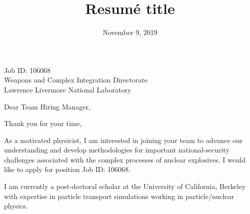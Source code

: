 \documentclass[11pt]{moderncv}        %
\title{Resumé title}                               %
\begin{document}
{Job ID: 106068\\Weapons and Complex Integration Directorate\\Lawrence Livermore National Laboratory}
\date{November 9, 2019}
\opening{Dear Team Hiring Manager,}
\closing{Thank you for your time,}
\makelettertitle

As a motivated physicist, I am interested in joining your team to advance our understanding and develop methodologies for important national-security challenges
associated with the complex processes of nuclear explosives. I would like to
apply for position Job ID: 106068.

I am currently a post-doctoral scholar at the University of California,
Berkeley with expertise in particle transport simulations working in
particle/nuclear physics.


\end{document}
